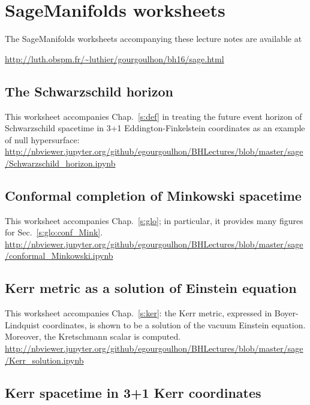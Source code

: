 \section{SageManifolds worksheets} \label{s:sam:worksheets}

The SageManifolds worksheets accompanying these lecture notes are available
at\\

\centerline{
\url{http://luth.obspm.fr/~luthier/gourgoulhon/bh16/sage.html}}

\subsection{The Schwarzschild horizon}

This worksheet accompanies Chap.~\ref{s:def} in treating the future event horizon of
Schwarzschild spacetime in 3+1 Eddington-Finkelstein coordinates as an example of null hypersurface:\\[1ex]
{\footnotesize
\url{http://nbviewer.jupyter.org/github/egourgoulhon/BHLectures/blob/master/sage/Schwarzschild_horizon.ipynb}
}

\subsection{Conformal completion of Minkowski spacetime}

This worksheet accompanies Chap.~\ref{s:glo}; in particular, it provides
many figures for Sec.~\ref{s:glo:conf_Mink}.\\[1ex]
{\footnotesize
\url{http://nbviewer.jupyter.org/github/egourgoulhon/BHLectures/blob/master/sage/conformal_Minkowski.ipynb}
}

\subsection{Kerr metric as a solution of Einstein equation} \label{s:sam:Kerr_solution}

This worksheet accompanies Chap.~\ref{s:ker}: the Kerr metric, expressed in Boyer-Lindquist
coordinates, is shown to be a solution of the vacuum Einstein equation. Moreover, the Kretschmann scalar is computed.\\[1ex]
{\footnotesize
\url{http://nbviewer.jupyter.org/github/egourgoulhon/BHLectures/blob/master/sage/Kerr_solution.ipynb}
}

\subsection{Kerr spacetime in 3+1 Kerr coordinates} \label{s:sam:Kerr_Kerr_coord}

